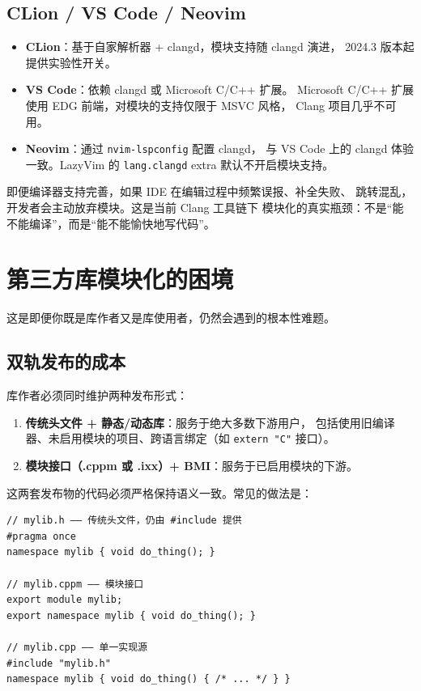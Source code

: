 \documentclass[12pt,a4paper,fontset=fandol]{ctexbook}
\newcommand{\cpplabel}{%
  \tcbox[on line,colback=cppheadbg,colframe=cppheadbg,
    boxrule=0pt,arc=1pt,left=2pt,right=2pt,top=1pt,bottom=1pt,
    colupper=white,fontupper=\scriptsize\bfseries]{C++}}
\newcommand{\flag}[1]{\texttt{#1}}
\begin{document}
\section{CLion / VS Code / Neovim}

\begin{itemize}
  \item \textbf{CLion}：基于自家解析器 + clangd，模块支持随 clangd 演进，
        2024.3 版本起提供实验性开关。
  \item \textbf{VS Code}：依赖 clangd 或 Microsoft C/C++ 扩展。
        Microsoft C/C++ 扩展使用 EDG 前端，对模块的支持仅限于 MSVC 风格，
        Clang 项目几乎不可用。
  \item \textbf{Neovim}：通过 \texttt{nvim-lspconfig} 配置 clangd，
        与 VS Code 上的 clangd 体验一致。LazyVim 的
        \texttt{lang.clangd} extra 默认不开启模块支持。
\end{itemize}

\begin{warning}[title=LSP 滞后是模块化的最大体验杀手]
即便编译器支持完善，如果 IDE 在编辑过程中频繁误报、补全失败、
跳转混乱，开发者会主动放弃模块。这是当前 Clang 工具链下
模块化的真实瓶颈：不是“能不能编译”，而是“能不能愉快地写代码”。
\end{warning}

\chapter{第三方库模块化的困境}

这是即便你既是库作者又是库使用者，仍然会遇到的根本性难题。

\section{双轨发布的成本}

库作者必须同时维护两种发布形式：

\begin{enumerate}
  \item \textbf{传统头文件 + 静态/动态库}：服务于绝大多数下游用户，
        包括使用旧编译器、未启用模块的项目、跨语言绑定（如
        \flag{extern "C"} 接口）。
  \item \textbf{模块接口（.cppm 或 .ixx）+ BMI}：服务于已启用模块的下游。
\end{enumerate}

这两套发布物的代码必须严格保持语义一致。常见的做法是：

\cpplabel
\begin{lstlisting}[style=cppstyle]
// mylib.h —— 传统头文件，仍由 #include 提供
#pragma once
namespace mylib { void do_thing(); }

// mylib.cppm —— 模块接口
export module mylib;
export namespace mylib { void do_thing(); }

// mylib.cpp —— 单一实现源
#include "mylib.h"
namespace mylib { void do_thing() { /* ... */ } }
\end{lstlisting}
\end{document}
